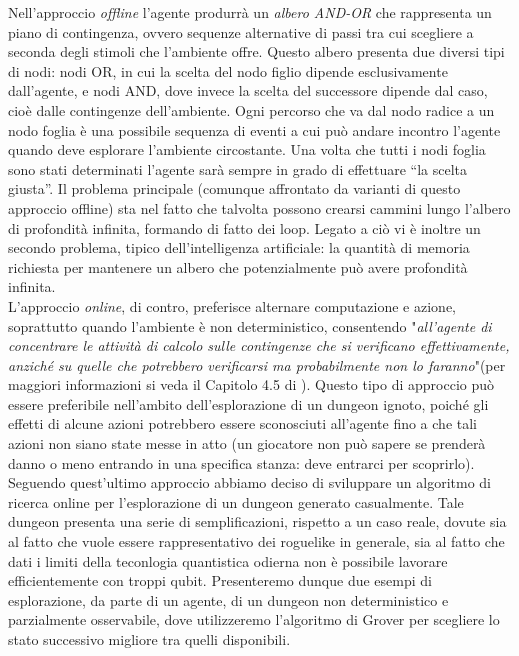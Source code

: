 \documentclass{book}
\theoremstyle{definition}
\theoremstyle{definition}
\theoremstyle{definition}
\theoremstyle{plain}
\theoremstyle{plain}
\theoremstyle{plain}
\theoremstyle{plain}
\begin{document}
Nell'approccio \textit{offline} l'agente produrrà un \textit{albero AND-OR} che rappresenta un piano di contingenza, ovvero sequenze alternative di passi tra cui scegliere a seconda degli stimoli che l'ambiente offre. Questo albero presenta due diversi tipi di nodi: nodi OR, in cui la scelta del nodo figlio dipende esclusivamente dall'agente, e nodi AND, dove invece la scelta del successore dipende dal caso, cioè dalle contingenze dell'ambiente. Ogni percorso che va dal nodo radice a un nodo foglia è una possibile sequenza di eventi a cui può andare incontro l'agente quando deve esplorare l'ambiente circostante. Una volta che tutti i nodi foglia sono stati determinati l'agente sarà sempre in grado di effettuare ``la scelta giusta''. Il problema principale (comunque affrontato da varianti di questo approccio offline) sta nel fatto che talvolta possono crearsi cammini lungo l'albero di profondità infinita, formando di fatto dei loop. Legato a ciò vi è inoltre un secondo problema, tipico dell'intelligenza artificiale: la quantità di memoria richiesta per mantenere un albero che potenzialmente può avere profondità infinita. \\
L'approccio \textit{online}, di contro, preferisce alternare computazione e azione, soprattutto quando l'ambiente è non deterministico, consentendo "\textit{all'agente di concentrare le attività di calcolo sulle contingenze che si verificano effettivamente, anziché su quelle che potrebbero verificarsi ma probabilmente non lo faranno}"(per maggiori informazioni si veda il Capitolo 4.5 di \cite{aima}). Questo tipo di approccio può essere preferibile nell'ambito dell'esplorazione di un dungeon ignoto, poiché gli effetti di alcune azioni potrebbero essere sconosciuti all'agente fino a che tali azioni non siano state messe in atto (un giocatore non può sapere se prenderà danno o meno entrando in una specifica stanza: deve entrarci per scoprirlo). \\
Seguendo quest'ultimo approccio abbiamo deciso di sviluppare un algoritmo di ricerca online per l'esplorazione di un dungeon generato casualmente. Tale dungeon presenta una serie di semplificazioni, rispetto a un caso reale, dovute sia al fatto che vuole essere rappresentativo dei roguelike in generale, sia al fatto che dati i limiti della teconlogia quantistica odierna non è possibile lavorare efficientemente con troppi qubit. Presenteremo dunque due esempi di esplorazione, da parte di un agente, di un dungeon non deterministico e parzialmente osservabile, dove utilizzeremo l'algoritmo di Grover per scegliere lo stato successivo migliore tra quelli disponibili.
\end{document}

